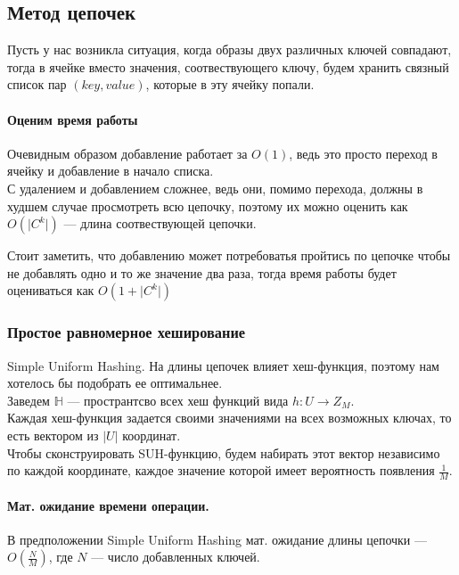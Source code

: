 \subsection{Метод цепочек}
Пусть у нас возникла ситуация, когда образы двух различных ключей совпадают, тогда в ячейке вместо значения, 
соотвествующего ключу, будем хранить связный список пар $(key, value)$, которые в эту ячейку попали.

\paragraph{Оценим время работы}%
\label{par:Оценим время работы}
Очевидным образом добавление работает за $O(1)$, ведь это просто переход в ячейку и добавление в начало списка. \\
С удалением и добавлением сложнее, ведь они, помимо перехода, должны в худшем случае просмотреть всю цепочку, 
поэтому их можно оценить как $O(\lvert C^k \rvert)$ --- длина соотвествующей цепочки.

\begin{note}
    Стоит заметить, что добавлению может потребоватья пройтись по цепочке чтобы не добавлять одно и то же значение два раза,
    тогда время работы будет оцениваться как $O(1 + \lvert C^k \rvert)$
\end{note}

\subsubsection{Простое равномерное хеширование}
Simple Uniform Hashing.
На длины цепочек влияет хеш-функция, поэтому нам хотелось бы подобрать ее оптимальнее. \\
Заведем $\mathbb{H}$ --- пространтсво всех хеш функций вида $h: U \to Z_M$. \\ 

Каждая хеш-функция задается своими значениями на всех возможных ключах, 
то есть вектором из $\lvert U \rvert$ координат. \\

Чтобы сконструировать SUH-функцию, будем набирать этот вектор независимо по каждой координате,
каждое значение которой имеет вероятность появления $\frac{1}{M}$.

\paragraph{Мат. ожидание времени операции.}
\begin{theorem}
    В предположении Simple Uniform Hashing мат. ожидание длины цепочки --- $O(\frac{N}{M})$, где $N$ --- число добавленных ключей.
\end{theorem}

